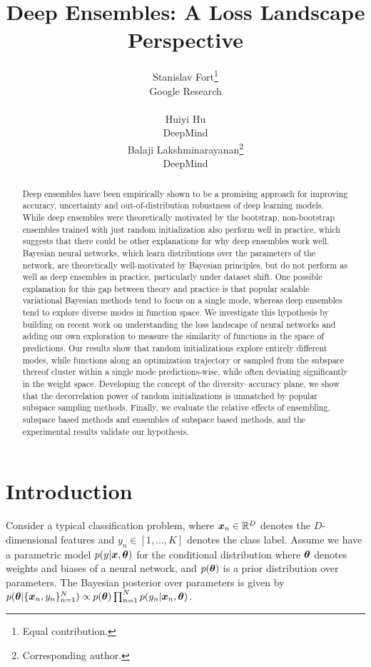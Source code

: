 \documentclass{article}
\title{Deep Ensembles: A Loss Landscape Perspective}
\author{Stanislav Fort\thanks{Equal contribution.}
%
\\
Google Research\\
%
%
\email{sfort1@stanford.edu} \\
\And
Huiyi Hu\footnotemark[1] \\
DeepMind \\
\email{clarahu@google.com}
\And
Balaji Lakshminarayanan\thanks{Corresponding author.  %
} \\
DeepMind \\
\email{balajiln@google.com}
}
\newcommand{\Reals}{\mathbb{R}}
\begin{document}
\maketitle

 \begin{abstract}
Deep ensembles have been empirically shown to be a promising approach for improving accuracy, uncertainty  and out-of-distribution robustness of deep learning models. While deep ensembles were theoretically motivated by the bootstrap, non-bootstrap ensembles trained with just random initialization also perform well in practice, which suggests that there could be other explanations for why deep ensembles work well. Bayesian neural networks, which learn distributions over the parameters of the network, are theoretically well-motivated by Bayesian principles, but do not perform as well as deep ensembles in practice, particularly under dataset shift. One possible explanation for this gap between theory and practice is that popular scalable variational Bayesian methods tend to focus on a single mode, whereas deep ensembles tend to explore diverse modes in function space. We investigate this hypothesis by building on recent work on understanding the loss landscape of neural networks and adding our own exploration to measure the similarity of functions in the space of predictions. Our results show that random initializations explore entirely different modes, while functions along an optimization trajectory or sampled from the subspace thereof cluster within a single mode predictions-wise, while often deviating significantly in the weight space. 
%
Developing the concept of the diversity--accuracy plane, we show that the decorrelation power of random initializations is unmatched by popular subspace sampling methods. Finally, we evaluate the relative effects of ensembling, subspace based methods and ensembles of subspace based methods, %
and the experimental results validate our hypothesis.  %
%
 \end{abstract}

\section{Introduction}
%

%

Consider a typical classification problem, where  $\vx_n\in\Reals^D$ denotes the $D$-dimensional features and $y_n\in[1,\ldots,K]$ denotes the class label. 
%
Assume we have a parametric model $p(y| {\bm{x}}, {\bm{\theta}})$ for the conditional distribution where ${\bm{\theta}}$ denotes weights and biases of a neural network, and $p({\bm{\theta}})$ is a prior distribution over parameters. 
The Bayesian posterior over parameters is given by
$p({\bm{\theta}}| \{{\bm{x}}_n,y_n\}_{n=1}^N) \propto p({\bm{\theta}}) \prod_{n=1}^N p(y_n | {\bm{x}}_n, {\bm{\theta}})$.
%
%
%
%
\end{document}
